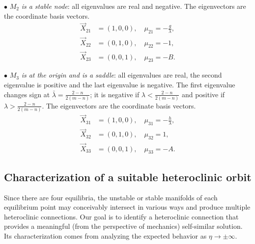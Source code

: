 \documentclass[a4paper,11pt]{article}
\numberwithin{step}{dummy}
\begin{document}
$\bullet$ $M_2$ \emph{is a stable node}: all eigenvalues are real and negative. The eigenvectors are the coordinate basis vectors.
\begin{align*}
  \vec{X}_{21} &= (1,0,0), \quad \mu_{21}=- \frac{g}{ \lambda},\\%
  \vec{X}_{22} &= (0,1,0), \quad \mu_{22}=-1,\\
  \vec{X}_{23} &= (0,0,1), \quad \mu_{23}=-B.%
\end{align*}

$\bullet$ $M_3$ \emph{is at the origin and is a saddle}: all eigenvalues are real, the second eigenvalue is positive and the last eigenvalue is negative. 
The first eigenvalue changes sign at $\bar\lambda=\frac{2-n}{2(m-n)}$; it is negative if $\lambda<\frac{2-n}{2(m-n)}$ and positive if $\lambda>\frac{2-n}{2(m-n)}$. The eigenvectors are the coordinate basis vectors.
\begin{align*}
  \vec{X}_{31} &= (1,0,0), \quad \mu_{31}=- \frac{h}{ \lambda},\\%
  \vec{X}_{32} &= (0,1,0), \quad \mu_{32}=1,\\
  \vec{X}_{33} &= (0,0,1), \quad \mu_{33}=-A.%
\end{align*}

\subsection{Characterization of a suitable heteroclinic orbit} \label{sec:char}
Since there are four equilibria, the unstable or stable manifolds of each equilibrium point may conceivably intersect in various ways
and produce multiple heteroclinic connections. 
Our goal is to identify a  heteroclinic connection that provides a meaningful (from the perspective of mechanics) self-similar solution. 
Its characterization comes from analyzing the expected behavior as $\eta \rightarrow \pm\infty$. %
\end{document}
